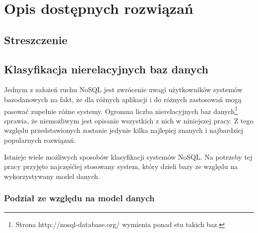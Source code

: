 \chapter{Opis dostępnych rozwiązań}

\section*{Streszczenie}

\section{Klasyfikacja nierelacyjnych baz danych}

Jednym z założeń ruchu NoSQL jest zwrócenie uwagi użytkowników systemów bazodanowych na fakt, że dla różnych aplikacji i do różnych zastosowań mogą pasować zupełnie różne systemy.
Ogromna liczba nierelacyjnych baz danych\footnote{Strona http://nosql-database.org/ wymienia ponad stu takich baz.} sprawia, że niemożliwym jest opisanie wszystkich z nich w niniejszej pracy.
Z tego względu przedstawionych zostanie jedynie kilka najlepiej znanych i najbardziej popularnych rozwiązań.

Istnieje wiele możliwych sposobów klasyfikacji systemów NoSQL.
Na potrzeby tej pracy przyjęto najczęśćiej stosowany system, który dzieli bazy ze względu na wykorzystywany model danych.

\subsection*{Podział ze względu na model danych}

